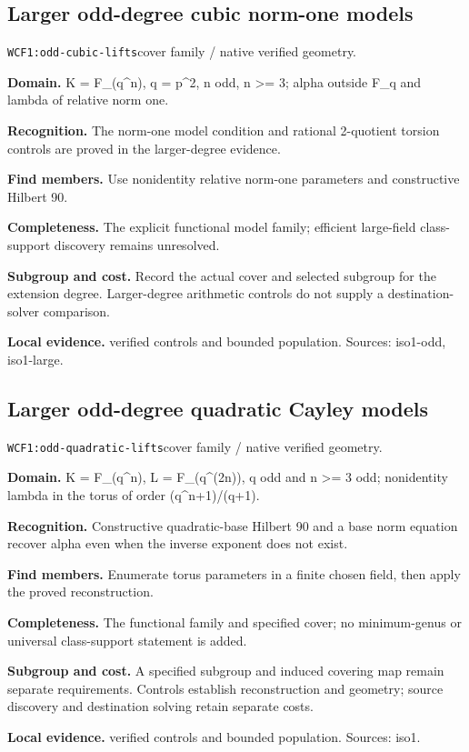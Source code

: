 \documentclass[10pt]{article}
\begin{document}
\subsection{Larger odd-degree cubic norm-one models}
\texttt{WCF1:odd-cubic-lifts}\quad cover family / native verified geometry.\par
\textbf{Domain.} K = F\_(q\textasciicircum{}n), q = p\textasciicircum{}2, n odd, n >= 3; alpha outside F\_q and lambda of relative norm one.\par
\textbf{Recognition.} The norm-one model condition and rational 2-quotient torsion controls are proved in the larger-degree evidence.\par
\textbf{Find members.} Use nonidentity relative norm-one parameters and constructive Hilbert 90.\par
\textbf{Completeness.} The explicit functional model family; efficient large-field class-support discovery remains unresolved.\par
\textbf{Subgroup and cost.} Record the actual cover and selected subgroup for the extension degree. Larger-degree arithmetic controls do not supply a destination-solver comparison.\par
\textbf{Local evidence.} verified controls and bounded population. Sources: iso1-odd, iso1-large.
\subsection{Larger odd-degree quadratic Cayley models}
\texttt{WCF1:odd-quadratic-lifts}\quad cover family / native verified geometry.\par
\textbf{Domain.} K = F\_(q\textasciicircum{}n), L = F\_(q\textasciicircum{}(2n)), q odd and n >= 3 odd; nonidentity lambda in the torus of order (q\textasciicircum{}n+1)/(q+1).\par
\textbf{Recognition.} Constructive quadratic-base Hilbert 90 and a base norm equation recover alpha even when the inverse exponent does not exist.\par
\textbf{Find members.} Enumerate torus parameters in a finite chosen field, then apply the proved reconstruction.\par
\textbf{Completeness.} The functional family and specified cover; no minimum-genus or universal class-support statement is added.\par
\textbf{Subgroup and cost.} A specified subgroup and induced covering map remain separate requirements. Controls establish reconstruction and geometry; source discovery and destination solving retain separate costs.\par
\textbf{Local evidence.} verified controls and bounded population. Sources: iso1.
\end{document}
